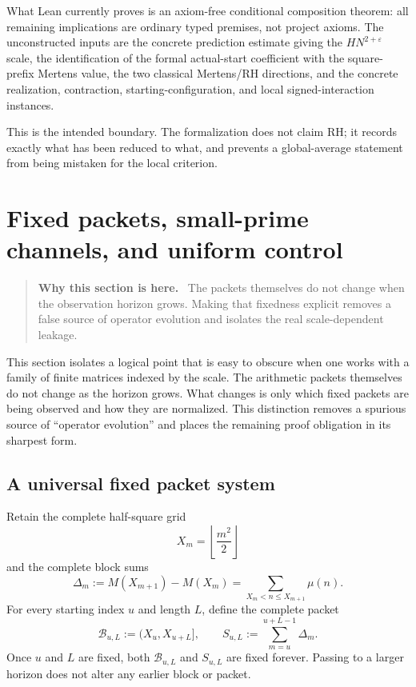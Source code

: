 \documentclass[11pt]{article}
\theoremstyle{definition}
\theoremstyle{remark}
\newcommand{\eps}{\varepsilon}
\newcommand{\1}{\mathbf{1}}
\newenvironment{motivation}
  {\begin{quote}\small\color{ovvogray}\textbf{Why this section is here.}\ }
  {\end{quote}}
\begin{document}
What Lean currently proves is an axiom-free conditional composition theorem: all remaining implications are ordinary typed premises, not project axioms.  The unconstructed inputs are the concrete prediction estimate giving the $HN^{2+\eps}$ scale, the identification of the formal actual-start coefficient with the square-prefix Mertens value, the two classical Mertens/RH directions, and the concrete realization, contraction, starting-configuration, and local signed-interaction instances.

This is the intended boundary.  The formalization does not claim RH; it records exactly what has been reduced to what, and prevents a global-average statement from being mistaken for the local criterion.

\section{Fixed packets, small-prime channels, and uniform control}
\label{sec:fixed-packet}

\begin{motivation}
The packets themselves do not change when the observation horizon grows.  Making that fixedness explicit removes a false source of operator evolution and isolates the real scale-dependent leakage.
\end{motivation}

This section isolates a logical point that is easy to obscure when one works with a
family of finite matrices indexed by the scale.  The arithmetic packets themselves do
not change as the horizon grows.  What changes is only which fixed packets are being
observed and how they are normalized.  This distinction removes a spurious source of
``operator evolution'' and places the remaining proof obligation in its sharpest form.

\subsection{A universal fixed packet system}

Retain the complete half-square grid
\[
 X_m=\left\lfloor\frac{m^2}{2}\right\rfloor
\]
and the complete block sums
\[
 \Delta_m:=M(X_{m+1})-M(X_m)
 =\sum_{X_m<n\le X_{m+1}}\mu(n).
\]
For every starting index $u$ and length $L$, define the complete packet
\begin{equation}
 \mathcal B_{u,L}:=(X_u,X_{u+L}],
 \qquad
 S_{u,L}:=\sum_{m=u}^{u+L-1}\Delta_m.
 \label{eq:fixed-packet-def}
\end{equation}
Once $u$ and $L$ are fixed, both $\mathcal B_{u,L}$ and $S_{u,L}$ are fixed forever.
Passing to a larger horizon does not alter any earlier block or packet.
\end{document}
